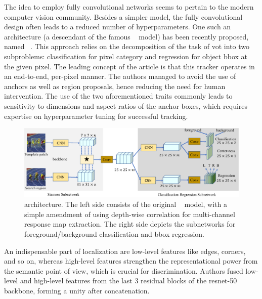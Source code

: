 The idea to employ fully convolutional networks seems to pertain to the modern computer vision community. Besides a simpler model, the fully convolutional design often leads to a reduced number of hyperparameters. One such an architecture (a descendant of the famous \siamfc{}~\cite{bertinetto2016siamfc} model) has been recently proposed, named \siamcar{}~\cite{guo2019siamcar}. This approach relies on the decomposition of the task of \gls{vot} into two subproblems: classification for pixel category and regression for object \gls{bbox} at the given pixel. The leading concept of the article is that this tracker operates in an end-to-end, per-pixel manner. The authors managed to avoid the use of anchors as well as region proposals, hence reducing the need for human intervention. The use of the two aforementioned traits commonly leads to sensitivity to dimensions and aspect ratios of the anchor boxes, which requires expertise on hyperparameter tuning for successful tracking.

\begin{figure}[t]
    \centerline{\includegraphics[width=\linewidth]{figures/theoretical_foundations/siamcar_architecture.pdf}}
    \caption[\siamcar{} architecture]{\siamcar{} architecture. The left side consists of the original \siamfc{}~\cite{bertinetto2016siamfc} model, with a simple amendment of using depth-wise correlation for multi-channel response map extraction. The right side depicts the subnetworks for foreground/background classification and \gls{bbox} regression. }
    \label{fig:SiamCARArchitecture}
\end{figure}

An indispensable part of localization are low-level features like edges, corners, and so on, whereas high-level features strengthen the representational power from the semantic point of view, which is crucial for discrimination. Authors fused low-level and high-level features from the last $3$ residual blocks of the \gls{resnet}-50 backbone, forming a unity after concatenation.


